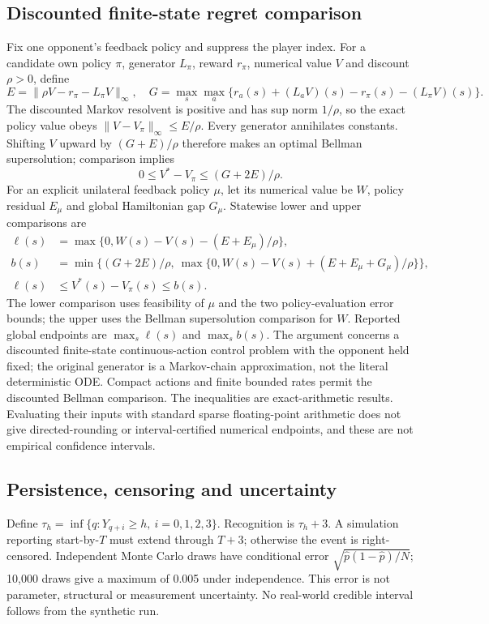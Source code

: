 \documentclass[11pt]{article}
\begin{document}
\subsection{Discounted finite-state regret comparison}\label{app:dynamicdeviation}
Fix one opponent's feedback policy and suppress the player index. For a candidate own policy $\pi$, generator $L_\pi$, reward $r_\pi$, numerical value $V$ and discount $\rho>0$, define
\begin{equation}
 E=\|\rho V-r_\pi-L_\pi V\|_\infty,\quad
 G=\max_s\max_a\{r_a(s)+(L_aV)(s)-r_\pi(s)-(L_\pi V)(s)\}.
\end{equation}
The discounted Markov resolvent is positive and has sup norm $1/\rho$, so the exact policy value obeys $\|V-V_\pi\|_\infty\leq E/\rho$. Every generator annihilates constants. Shifting $V$ upward by $(G+E)/\rho$ therefore makes an optimal Bellman supersolution; comparison implies
\begin{equation}
 0\leq V^*-V_\pi\leq (G+2E)/\rho.
\end{equation}
For an explicit unilateral feedback policy $\mu$, let its numerical value be $W$, policy residual $E_\mu$ and global Hamiltonian gap $G_\mu$. Statewise lower and upper comparisons are
\begin{align}
 \ell(s)&=\max\{0,W(s)-V(s)-(E+E_\mu)/\rho\},\\
 b(s)&=\min\{(G+2E)/\rho,\ \max\{0,W(s)-V(s)+(E+E_\mu+G_\mu)/\rho\}\},\\
 \ell(s)&\leq V^*(s)-V_\pi(s)\leq b(s).
\end{align}
The lower comparison uses feasibility of $\mu$ and the two policy-evaluation error bounds; the upper uses the Bellman supersolution comparison for $W$. Reported global endpoints are $\max_s\ell(s)$ and $\max_sb(s)$. The argument concerns a discounted finite-state continuous-action control problem with the opponent held fixed; the original generator is a Markov-chain approximation, not the literal deterministic ODE. Compact actions and finite bounded rates permit the discounted Bellman comparison. The inequalities are exact-arithmetic results. Evaluating their inputs with standard sparse floating-point arithmetic does not give directed-rounding or interval-certified numerical endpoints, and these are not empirical confidence intervals.

\subsection{Persistence, censoring and uncertainty}
Define $\tau_h=\inf\{q:Y_{q+i}\geq h,\ i=0,1,2,3\}$. Recognition is $\tau_h+3$. A simulation reporting start-by-$T$ must extend through $T+3$; otherwise the event is right-censored. Independent Monte Carlo draws have conditional error $\sqrt{\hat p(1-\hat p)/N}$; 10,000 draws give a maximum of 0.005 under independence. This error is not parameter, structural or measurement uncertainty. No real-world credible interval follows from the synthetic run.
\end{document}
